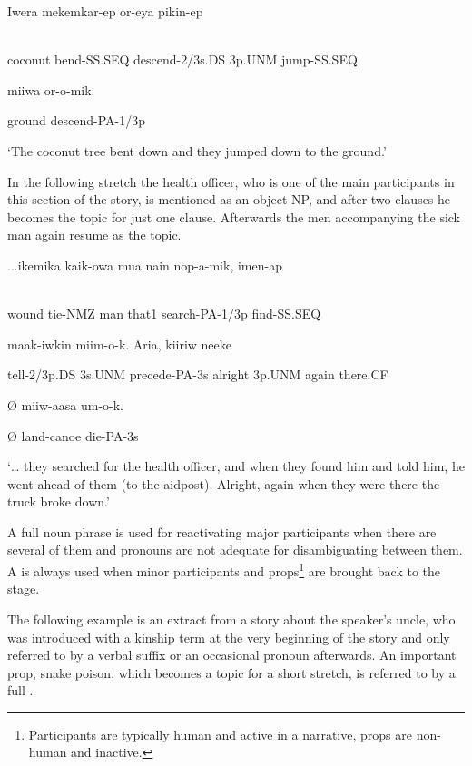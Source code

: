 \ea%
\label{ex:x1923}
\gll Iwera  mekemkar-ep  or-eya    pikin-ep  \\
      \\
\glt
\z

coconut  bend-SS.SEQ  descend-2/3s.DS  3p.UNM  jump-SS.SEQ

miiwa  or-o-mik.

ground  descend-PA-1/3p

`The coconut tree bent down and they jumped down to the ground.'

In the following stretch the health officer, who is one of the main participants in this section of the story, is mentioned as an object NP, and after two clauses he becomes the topic for just one clause. Afterwards the men accompanying the sick man again resume as the topic. 

\ea%
\label{ex:x1924}
\gll ...ikemika  kaik-owa  mua  nain  nop-a-mik,  imen-ap  \\
      \\
\glt
\z

wound  tie-NMZ  man  that1  search-PA-1/3p  find-SS.SEQ  

maak-iwkin    miim-o-k.  Aria,    kiiriw  neeke

tell-2/3p.DS  3s.UNM  precede-PA-3s  alright  3p.UNM  again  there.CF

{\O}  miiw-aasa  um-o-k.

{\O}  land-canoe  die-PA-3s

`{\dots} they searched for the health officer, and when they found him and told him, he went ahead of them (to the aidpost). Alright, again when they were there the truck broke down.'

A full noun phrase is used for reactivating major participants when there are several of them and pronouns are not adequate for disambiguating between them. A  is always used when minor participants and props\footnote{Participants are typically human and active in a narrative, props are non-human and inactive. }  are brought back to the stage. 

The following example is an extract from a story about the speaker's uncle, who was introduced with a kinship term at the very beginning of the story and only referred to by a verbal suffix or an occasional pronoun afterwards. An  important prop, snake poison, which becomes a topic for a short stretch, is referred to by a full .

